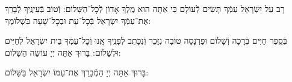 \documentclass[twoside, openany, parskip=half, 11pt]{book}
\begin{document}
\weekdaysamalchus

\weekdaysashemakoleinu

\retzeh

\yaalehveyavo

\zion

\maarivmodim

\alhanisim

\weekdaysahodos

רָב עַל יִשְׂרָאֵל עַמְּֿךָ תָּשִׂים לְֿעוֹלָם כִּי אַתָּה הוּא מֶֽלֶךְ אָדוֹן לְֿכׇל־הַשָּׁלוֹם: וְֿטוֹב בְּֿעֵינֶֽיךָ לְֿבָרֵךְ אֶת־עַמְּֿךָ יִשְׂרָאֵל בְּֿכׇל־עֵת וּבְכׇל־שָׁעָה בִּשְׁלוֹמֶךָ:
\vspace{-0.4\baselineskip}
\begin{paracol}{2}
	
	\begin{small}
		בְּֿסֵֽפֶר חַיִּים בְּֿרָכָה וְֿשָׁלוֹם וּפַרְנָסָה טוֹבָה נִזָּכֵר וְֿנִכָּתֵב לְֿפָנֶֽיךָ אָֽנוּ וְֿכׇל־עַמְּֿךָ בֵּית יִשְׂרָאֵל לְֿחַיִּים וּלְשָׁלוֹם: בָּרוּךְ אַתָּה יְיָ עוֹשֵׂה הַשָּׁלוֹם:
		
	\end{small}
	\switchcolumn
	בָּרוּךְ אַתָּה יְיָ הַמְֿבָרֵךְ אֶת־עַמּוֹ יִשְׂרָאֵל בַּשָּׁלוֹם:
	
\end{paracol}



\tachanunim

\vspace{\baselineskip}
\end{document}
